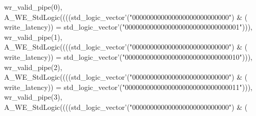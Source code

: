\begin{DoxyCode}
{      wr_valid_pipe}\textcolor{vhdlchar}{(}\textcolor{vhdllogic}{}\textcolor{vhdllogic}{0}\textcolor{vhdlchar}{)}\textcolor{vhdlchar}{,} \textcolor{vhdlchar}{A\_WE\_StdLogic}\textcolor{vhdlchar}{(}\textcolor{vhdlchar}{(}\textcolor{vhdlchar}{(}\textcolor{vhdlchar}{(}\textcolor{comment}{std\_logic\_vector}\textcolor{vhdlchar}{'}\textcolor{vhdlchar}{(}\textcolor{vhdllogic}{"000000000000000000000000000"}\textcolor{vhdlchar}{)} \textcolor{vhdlchar}{&} \textcolor{vhdlchar}{(}\textcolor{vhdlchar}{
      write_latency}\textcolor{vhdlchar}{)}\textcolor{vhdlchar}{)} \textcolor{vhdlchar}{=} \textcolor{comment}{std\_logic\_vector}\textcolor{vhdlchar}{'}\textcolor{vhdlchar}{(}\textcolor{vhdllogic}{"00000000000000000000000000000001"}\textcolor{vhdlchar}{)}\textcolor{vhdlchar}{)}\textcolor{vhdlchar}{)}\textcolor{vhdlchar}{,} \textcolor{vhdlchar}{
      wr_valid_pipe}\textcolor{vhdlchar}{(}\textcolor{vhdllogic}{}\textcolor{vhdllogic}{1}\textcolor{vhdlchar}{)}\textcolor{vhdlchar}{,} \textcolor{vhdlchar}{A\_WE\_StdLogic}\textcolor{vhdlchar}{(}\textcolor{vhdlchar}{(}\textcolor{vhdlchar}{(}\textcolor{vhdlchar}{(}\textcolor{comment}{std\_logic\_vector}\textcolor{vhdlchar}{'}\textcolor{vhdlchar}{(}\textcolor{vhdllogic}{"000000000000000000000000000"}\textcolor{vhdlchar}{)} \textcolor{vhdlchar}{&} \textcolor{vhdlchar}{(}\textcolor{vhdlchar}{
      write_latency}\textcolor{vhdlchar}{)}\textcolor{vhdlchar}{)} \textcolor{vhdlchar}{=} \textcolor{comment}{std\_logic\_vector}\textcolor{vhdlchar}{'}\textcolor{vhdlchar}{(}\textcolor{vhdllogic}{"00000000000000000000000000000010"}\textcolor{vhdlchar}{)}\textcolor{vhdlchar}{)}\textcolor{vhdlchar}{)}\textcolor{vhdlchar}{,} \textcolor{vhdlchar}{
      wr_valid_pipe}\textcolor{vhdlchar}{(}\textcolor{vhdllogic}{}\textcolor{vhdllogic}{2}\textcolor{vhdlchar}{)}\textcolor{vhdlchar}{,} \textcolor{vhdlchar}{A\_WE\_StdLogic}\textcolor{vhdlchar}{(}\textcolor{vhdlchar}{(}\textcolor{vhdlchar}{(}\textcolor{vhdlchar}{(}\textcolor{comment}{std\_logic\_vector}\textcolor{vhdlchar}{'}\textcolor{vhdlchar}{(}\textcolor{vhdllogic}{"000000000000000000000000000"}\textcolor{vhdlchar}{)} \textcolor{vhdlchar}{&} \textcolor{vhdlchar}{(}\textcolor{vhdlchar}{
      write_latency}\textcolor{vhdlchar}{)}\textcolor{vhdlchar}{)} \textcolor{vhdlchar}{=} \textcolor{comment}{std\_logic\_vector}\textcolor{vhdlchar}{'}\textcolor{vhdlchar}{(}\textcolor{vhdllogic}{"00000000000000000000000000000011"}\textcolor{vhdlchar}{)}\textcolor{vhdlchar}{)}\textcolor{vhdlchar}{)}\textcolor{vhdlchar}{,} \textcolor{vhdlchar}{
      wr_valid_pipe}\textcolor{vhdlchar}{(}\textcolor{vhdllogic}{}\textcolor{vhdllogic}{3}\textcolor{vhdlchar}{)}\textcolor{vhdlchar}{,} \textcolor{vhdlchar}{A\_WE\_StdLogic}\textcolor{vhdlchar}{(}\textcolor{vhdlchar}{(}\textcolor{vhdlchar}{(}\textcolor{vhdlchar}{(}\textcolor{comment}{std\_logic\_vector}\textcolor{vhdlchar}{'}\textcolor{vhdlchar}{(}\textcolor{vhdllogic}{"000000000000000000000000000"}\textcolor{vhdlchar}{)} \textcolor{vhdlchar}{&} \textcolor{vhdlchar}{(}\textcolor{vhdlchar}{
}
\end{DoxyCode}
